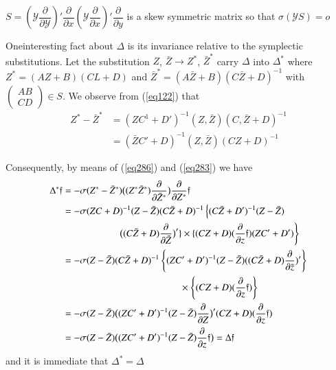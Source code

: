 $S=(\mathcal{Y}\dfrac{\partial}{\partial
  \mathcal{Y}})'\dfrac{\partial}{\partial x}( \mathcal{Y}
\dfrac{\partial}{\partial x})'\dfrac{\partial}{\partial y} $ \; is a skew
symmetric matrix so that \break $\sigma (\mathcal{Y} S) =o$ 

One\pageoriginale interesting fact about $\Delta$ is its invariance
relative to the 
symplectic substitutions. Let the substitution $Z$, $\bar{Z} \to Z^*$,
$\bar{Z}^*$ carry $\Delta$ into $\Delta^*$ where $Z^*= (AZ + B)(CL +
D)$ and $\bar{Z}^* = (A \bar{Z} + B) (C \bar{Z} + D)^{-1}$ with
$\begin{pmatrix} A  B\\C D \end{pmatrix} \in S$. We observe from
(\ref{eq122}) that  
\begin{align*}
Z^* - \bar{Z}^* & = (Z C^1 + D')^{-1} (Z, \bar{Z}) (C, \bar{Z} +
D)^{-1} \\
& = (\bar{Z}C' + D)^{-1} (Z, \bar{Z})(CZ + D)^{-1}
\tag*{$(122)'$}\label{eq122'}  
\end{align*}

Consequently, by means of (\ref{eq286}) and (\ref{eq283}) we have
\begin{align*} 
\Delta^* \mathfrak{f} & =  - \sigma (Z^* - \bar{Z}^*) \big((Z^*
\bar{Z}^*)\frac{\partial}{\partial \bar{Z}^*} \big)
\frac{\partial}{\partial Z^*} \mathfrak{f}\\ 
& = - \sigma (ZC + D)^{-1} (Z - \bar{Z}) (C \bar{Z} + D)^{-1} \left\{(C
\bar{Z} + D')^{-1} (Z - \bar{Z}) \right.\\
& \hspace{2cm} \left. \big( (C \bar{Z} + D)
\frac{\partial}{\partial \bar{Z}}\big)' \}  \times \{(CZ + D)
(\frac{\partial}{\partial z} \mathfrak{f}) (ZC' + D')  \right\}\\ 
& = - \sigma (Z- \bar{Z})(C \bar{Z} + D)^{-1} \left\{(ZC' + D')^{-1} (Z -
\bar{Z}) ((C \bar{Z} + D) \frac{\partial}{\partial \bar{z}} )'
\right\} \\
& \hspace{4.3cm} \times \left\{ (CZ + D) (\frac{\partial}{\partial z}
\mathfrak{f}) \right\}\\  
& = - \sigma(Z - \bar{Z}) \big( (ZC' + D')^{-1} (Z - \bar{Z})
\frac{\partial}{\partial Z}  \big)' (CZ + D) (\frac{\partial}{\partial
  z} \mathfrak{f})\\ 
& = - \sigma (Z- \bar{Z}) \big( (ZC ' + D')^{-1} (Z -\bar{Z})
\frac{\partial}{\partial z} \mathfrak{f} \big) = \Delta \mathfrak{f} 
\end{align*} 
and it is immediate that $\Delta^* = \Delta$

